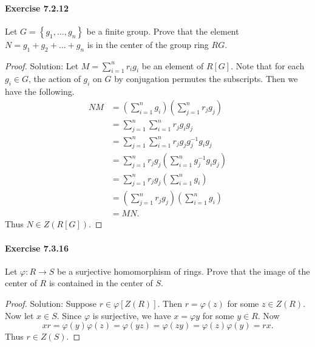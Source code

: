\documentclass{article}
\theoremstyle{definition}
\begin{document}
\paragraph{Exercise 7.2.12} Let $G=\left\{g_{1}, \ldots, g_{n}\right\}$ be a finite group. Prove that the element $N=g_{1}+g_{2}+\ldots+g_{n}$ is in the center of the group ring $R G$.
\begin{proof}
    Solution: Let $M=\sum_{i=1}^n r_i g_i$ be an element of $R[G]$. Note that for each $g_i \in G$, the action of $g_i$ on $G$ by conjugation permutes the subscripts. Then we have the following.
$$
\begin{aligned}
N M &=\left(\sum_{i=1}^n g_i\right)\left(\sum_{j=1}^n r_j g_j\right) \\
&=\sum_{j=1}^n \sum_{i=1}^n r_j g_i g_j \\
&=\sum_{j=1}^n \sum_{i=1}^n r_j g_j g_j^{-1} g_i g_j \\
&=\sum_{j=1}^n r_j g_j\left(\sum_{i=1}^n g_j^{-1} g_i g_j\right) \\
&=\sum_{j=1}^n r_j g_j\left(\sum_{i=1}^n g_i\right) \\
&=\left(\sum_{j=1}^n r_j g_j\right)\left(\sum_{i=1}^n g_i\right) \\
&=M N .
\end{aligned}
$$
Thus $N \in Z(R[G])$.
\end{proof}


\paragraph{Exercise 7.3.16} Let $\varphi: R \rightarrow S$ be a surjective homomorphism of rings. Prove that the image of the center of $R$ is contained in the center of $S$.
\begin{proof}
    Solution: Suppose $r \in \varphi[Z(R)]$. Then $r=\varphi(z)$ for some $z \in Z(R)$. Now let $x \in S$. Since $\varphi$ is surjective, we have $x=\varphi y$ for some $y \in R$. Now
$$
x r=\varphi(y) \varphi(z)=\varphi(y z)=\varphi(z y)=\varphi(z) \varphi(y)=r x .
$$
Thus $r \in Z(S)$.
\end{proof}
\end{document}
